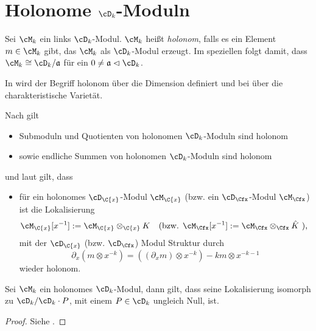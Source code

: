 \section{Holonome $\cD_k$-Moduln}
\begin{defn}
Sei $\cM_k$ ein links $\cD_k$-Modul. $\cM_k$ heißt \emph{holonom}, falls es ein
Element $m\in\cM_k$ gibt, das $\cM_k$ als $\cD_k$-Modul erzeugt. Im speziellen
folgt damit, dass $\cM_k\cong \cD_k/\mathfrak{a}$ für ein
$0\neq\mathfrak{a}\vartriangleleft\cD_k$.
\end{defn}
\begin{bem}
In \cite{coutinho1995primer} wird der Begriff holonom über die Dimension
definiert und bei \cite{sabbah_cimpa90} über die charakteristische Varietät.
\end{bem}

\begin{bem} 
Nach \cite[Prop 10.1.1]{coutinho1995primer} gilt
\begin{itemize}
\item Submoduln und Quotienten von holonomen $\cD_k$-Moduln sind holonom
\item sowie endliche Summen von holonomen $\cD_k$-Moduln sind holonom
\end{itemize}
und laut \cite[Thm. 4.2.3]{sabbah_cimpa90} gilt, dass
\begin{itemize}
\item für ein holonomes $\cD_{\C\{x\}}$-Modul $\cM_{\C\{x\}}$
(bzw. ein $\cD_{\Cfx}$-Modul $\cM_{\Cfx}$)
ist die Lokalisierung
\begin{align*}
\cM_{\C\{x\}}[x^{-1}]&:=\cM_{\C\{x\}}\otimes_{\C\{x\}}K
&&\text{(bzw. }\cM_{\Cfx}[x^{-1}]:=\cM_{\Cfx}\otimes_{\Cfx}\hat K\text{ ),}
\end{align*}
mit der $\cD_{\C\{x\}}$ (bzw. $\cD_{\Cfx}$) Modul Struktur durch
\[
\partial_x(m\otimes x^{-k})=((\partial_xm)\otimes x^{-k})-km\otimes x^{-k-1}
\]
wieder holonom.
\end{itemize}
\end{bem}

\begin{thm}
Sei $\cM_k$ ein holonomes $\cD_k$-Modul, dann gilt, dass seine Lokalisierung
isomorph zu $\cD_k/\cD_k\cdot P$, mit einem $P\in \cD_k$ ungleich Null, ist.
\end{thm}
\begin{proof}
Siehe \cite[Cor 4.2.8]{sabbah_cimpa90}.
\end{proof}

